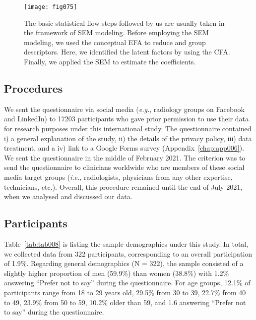 \begin{figure}[htpb]
\centering
\texttt{[image: fig075]}
\caption{The basic statistical flow steps followed by us are usually taken in the framework of SEM modeling. Before employing the SEM modeling, we used the conceptual EFA to reduce and group descriptors. Here, we identified the latent factors by using the CFA. Finally, we applied the SEM to estimate the coefficients.}
\label{fig:fig075}
\end{figure}

\subsection{Procedures}
\label{sec:chap004004001}

We sent the questionnaire via social media ({\it e.g.}, radiology groups on Facebook and LinkedIn) to 17203 participants who gave prior permission to use their data for research purposes under this international study.
The questionnaire contained i) a general explanation of the study, ii) the details of the privacy policy, iii) data treatment, and a iv) link to a Google Forms survey (Appendix~\ref{chap:app006}).
We sent the questionnaire in the middle of February 2021.
The criterion was to send the questionnaire to clinicians worldwide who are members of these social media target groups ({\it i.e.}, radiologists, physicians from any other expertise, technicians, etc.).
Overall, this procedure remained until the end of July 2021, when we analysed and discussed our data.

\subsection{Participants}
\label{sec:chap004004002}

\textcolor{revised}{Table~\ref{tab:tab008}} is listing the sample demographics under this study.
In total, we collected data from 322 participants, corresponding to an overall participation of 1.9\%.
Regarding general demographics (N = 322), the sample consisted of a slightly higher proportion of men (59.9\%) than women (38.8\%) with 1.2\% answering ``Prefer not to say'' during the questionnaire.
For age groups, 12.1\% of participants range from 18 to 29 years old, 29.5\% from 30 to 39, 22.7\% from 40 to 49, 23.9\% from 50 to 59, 10.2\% older than 59, and 1.6 answering ``Prefer not to say'' during the questionnaire.

